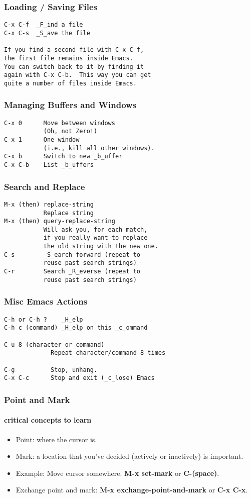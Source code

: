 \documentclass{beamer}
\begin{document}
\begin{frame}[fragile] \frametitle{Loading / Saving Files}
\begin{verbatim}
C-x C-f  _F_ind a file
C-x C-s  _S_ave the file

If you find a second file with C-x C-f, 
the first file remains inside Emacs.  
You can switch back to it by finding it 
again with C-x C-b.  This way you can get 
quite a number of files inside Emacs.
 \end{verbatim}
\end{frame}


\begin{frame}[fragile] \frametitle{Managing Buffers and Windows}
\begin{verbatim}
C-x 0      Move between windows  
           (Oh, not Zero!)
C-x 1      One window 
           (i.e., kill all other windows).
C-x b      Switch to new _b_uffer
C-x C-b    List _b_uffers
\end{verbatim}
\end{frame}


\begin{frame}[fragile] \frametitle{Search and Replace}
\begin{verbatim}
M-x (then) replace-string
           Replace string
M-x (then) query-replace-string
           Will ask you, for each match,
           if you really want to replace
           the old string with the new one.
C-s        _S_earch forward (repeat to
           reuse past search strings)
C-r        Search _R_everse (repeat to
           reuse past search strings)
\end{verbatim}
\end{frame}

                     
\begin{frame}[fragile] \frametitle{Misc Emacs Actions}
\begin{verbatim}
C-h or C-h ?    _H_elp
C-h c (command) _H_elp on this _c_ommand

C-u 8 (character or command)   
             Repeat character/command 8 times

C-g          Stop, unhang.
C-x C-c      Stop and exit (_c_lose) Emacs  
\end{verbatim}
\end{frame}


\begin{frame}
  \frametitle{Point and Mark}
  \framesubtitle{critical concepts to learn}

  \begin{itemize}
  \item Point:  where the cursor is.
  \item Mark: a location that you've decided (actively or inactively)
    is important.
  \item Example:   Move cursor somewhere.  \textbf{M-x set-mark} or
    \textbf{C-(space)}.
  \item Exchange point and mark:   \textbf{M-x
      exchange-point-and-mark} or \textbf{C-x C-x}.
  \end{itemize}
\end{frame}
\end{document}
